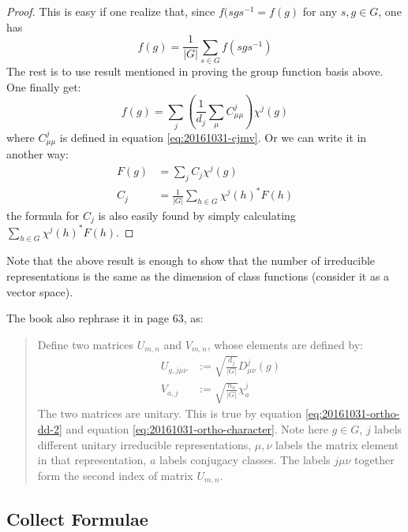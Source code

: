     \begin{proof}
        This is easy if one realize that, since $f(sgs^{-1}=f(g)$ for
        any $s,g\in G$, one has
        \begin{equation}
            f(g) = \frac{1}{|G|} \sum_{s\in G} f(s g s^{-1})
        \end{equation}
        The rest is to use result mentioned in proving the group
        function basis above. One finally get:
        \begin{equation}
            f(g) = \sum_j \left(\frac{1}{d_j}\sum_\mu
            C^j_{\mu\mu}\right) \chi^j(g)
        \end{equation}
        where $C^j_{\mu\mu}$ is defined in equation
        \ref{eq:20161031-cjmv}.
        Or we can write it in another way:
        \begin{align}
            F(g) &= \sum_j C_j \chi^j(g) \\
            C_j &= \frac{1}{|G|} \sum_{h\in G}\chi^j(h)^* F(h)
        \end{align}
        the formula for $C_j$ is also easily found by simply
        calculating $\sum_{h\in G}\chi^j(h)^* F(h)$.
    \end{proof}
    Note that the above result is enough to show that the number of
    irreducible representations is the same as the dimension of
    class functions (consider it as a vector space).

    The book \cite{book} also rephrase it in page 63, as:
    \begin{quote}
        Define two matrices $U_{m,n}$ and $V_{m,n}$, whose elements
        are defined by:
    \begin{align}
        U_{g,j\mu\nu} &:= \sqrt{\frac{d_j}{|G|}} D^j_{\mu\nu}(g) \\
        V_{a,j} &:= \sqrt{\frac{n_a}{|G|}} \chi^j_a
    \end{align}
    The two matrices are unitary. This is true by equation
    \ref{eq:20161031-ortho-dd-2} and equation
    \ref{eq:20161031-ortho-character}. Note here $g\in G$, $j$ labels
    different unitary irreducible representations, $\mu,\nu$ labels
    the matrix element in that representation, $a$ labels conjugacy
    classes. The labels $j\mu\nu$ together form the second index of
    matrix $U_{m,n}$. 
    \end{quote}

\subsection{Collect Formulae}
\label{sec:Collect-Formulae}

